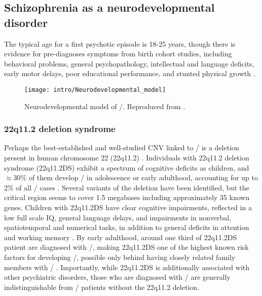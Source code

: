 \subsection{Schizophrenia as a neurodevelopmental disorder}
\label{sec:intro:scz:neurodevelopment}
The typical age for a first psychotic episode is 18-25 years, though there is 
evidence for pre-diagnoses symptoms from birth cohort studies, including behavioral problems, general psychopathology, intellectual and language deficits, early motor delays, poor educational performance, and stunted physical growth \citep{Welham2009}.
\citep{Lewis2002, Insel2010a}
\begin{figure}
	\centering
	\texttt{[image: intro/Neurodevelopmental\_model]}
	\caption[Neurodevelopmental model of \scz/]{Neurodevelopmental model of \scz/. Reproduced from \citet{Insel2010a}.}
	\label{fig:intro:scz:neurodevelopmental}
\end{figure}

\subsubsection{22q11.2 deletion syndrome}
\label{sec:into:scz:22q11}
Perhaps the best-established and well-studied CNV linked to \scz/ is a deletion present in human chromosome 22 (22q11.2) \citep{Karayiorgou1995, Chow2006, Karayiorgou2010}.
Individuals with 22q11.2 deletion syndrome (22q11.2DS) exhibit a spectrum of cognitive deficits as children, and $\approx$30\% of them develop \scz/ in adolescence or early adulthood, accounting for up to 2\% of all \scz/ cases \citep{Stark2008}.
Several variants of the deletion have been identified, but the critical region seems to cover 1.5 megabases including approximately 35 known genes.
Children with 22q11.2DS have clear cognitive impairments, reflected in a low full scale IQ, general language delays, and impairments in nonverbal, spatiotemporal and numerical tasks, in addition to general deficits in attention and working memory \citep{Karayiorgou2010}.
By early adulthood, around one third of 22q11.2DS patient are diagnosed with \scz/, making 22q11.2DS one of the highest known risk factors for developing \scz/, possible only behind having closely related family members with \scz/ \citep{Murphy1999}.
Importantly, while 22q11.2DS is additionally associated with other psychiatric disorders, those who are diagnosed with \scz/ are generally indistinguishable from \scz/ patients without the 22q11.2 deletion.

